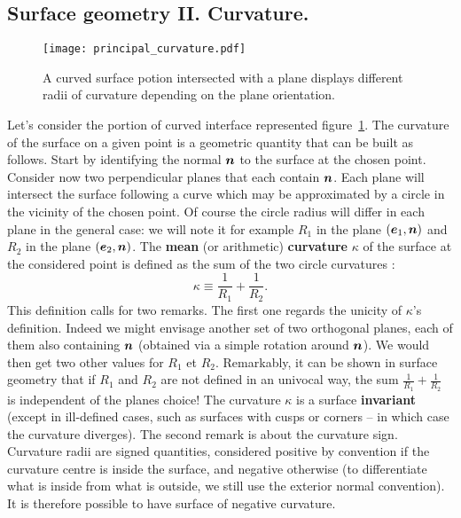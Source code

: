 \subsection{Surface geometry II. Curvature.}
\begin{figure}[htbp]
\begin{center}
\texttt{[image: principal\_curvature.pdf]} 
\end{center}
\caption{A curved surface potion intersected with a plane displays different radii of curvature depending on the plane orientation.}
\label{fig:principal_curvature}
\end{figure}
Let's consider the portion of curved interface represented figure~\ref{fig:principal_curvature}. The curvature of the surface on a given point is a geometric quantity that can be built as follows. Start by identifying the normal $\bn$ to the surface at the chosen point. Consider now two perpendicular planes that each contain $\bn$. Each plane will intersect the surface following a curve which may be approximated by a circle in the vicinity of the chosen point. Of course the circle radius will differ in each plane in the general case: we will note it for example $R_1$ in the plane $\lp\be_1,\bn\rp$ and $R_2$ in the plane $\lp\be_2,\bn\rp$. The \textbf{mean} (or arithmetic) \textbf{curvature} $\kappa$ of the surface at the considered point is defined as the sum of the two circle curvatures :
\begin{equation}
\kappa \equiv \frac{1}{R_1} + \frac{1}{R_2}.
\end{equation}
This definition calls for two remarks. The first one regards the unicity of $\kappa$'s definition. Indeed we might envisage another set of two orthogonal planes, each of them also containing $\bn$ (obtained via a simple rotation around $\bn$). We would then get two other values for $R_1$ et $R_2$. Remarkably, it can be shown in surface geometry that if $R_1$ and $R_2$ are not defined in an univocal way, the sum $\frac{1}{R_1} + \frac{1}{R_2}$ is independent of the planes choice! The curvature $\kappa$ is a surface \textbf{invariant} (except in ill-defined cases, such as surfaces with cusps or corners -- in which case the curvature diverges). The second remark is about the curvature sign. Curvature radii are signed quantities, considered positive by convention if the curvature centre is inside the surface, and negative otherwise (to differentiate what is inside from what is outside, we still use the exterior normal convention). It is therefore possible to have surface of negative curvature.

